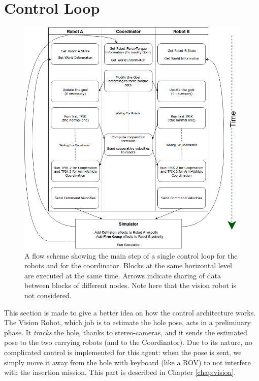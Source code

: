 \section{Control Loop}
\label{sec:controlLoop}
\begin{figure}[H]
	\centering
	\includegraphics[width=12cm]{flowScheme.png}	
	\caption[Flow Scheme Control Loop]{A flow scheme showing the main step of a single control loop for the robots and for the coordinator. Blocks at the same horizontal level are executed at the same time. Arrows indicate sharing of data between blocks of different nodes. Note here that the vision robot is not considered.}
	\label{fig:flowScheme}
\end{figure}

This section is made to give a better idea on how the control architecture works.\\
The Vision Robot, which job is to estimate the hole pose, acts in a preliminary phase. It \textit{tracks} the hole, thanks to stereo-cameras, and it sends the estimated pose to the two carrying robots (and to the Coordinator). Due to its nature, no complicated control is implemented for this agent: when the pose is sent, we simply move it away from the hole with keyboard (like a ROV) to not interfere with the insertion mission. This part is described in Chapter \ref{chap:vision}.\\

